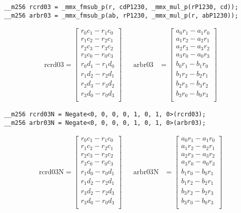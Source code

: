 \begin{verbatim}
__m256 rcrd03 = _mmx_fmsub_p(r, cdP1230, _mmx_mul_p(rP1230, cd));
__m256 arbr03 = _mmx_fmsub_p(ab, rP1230, _mmx_mul_p(r, abP1230));
\end{verbatim} 

\begin{align*}
\mathrm{rcrd03} 
=
\begin{bmatrix}
r_0c_1 - r_1c_0\\
r_1c_2 - r_2c_1\\
r_2c_3 - r_3c_2\\
r_3c_0 - r_0c_3\\
r_0d_1 - r_1d_0\\
r_1d_2 - r_2d_1\\
r_2d_3 - r_3d_2\\
r_3d_0 - r_0d_3\\
\end{bmatrix}
&&
\mathrm{arbr03} 
&=
\begin{bmatrix}
a_0r_1 - a_1r_0\\
a_1r_2 - a_2r_1\\
a_2r_3 - a_3r_2\\
a_3r_0 - a_0r_3\\
b_0r_1 - b_1r_0\\
b_1r_2 - b_2r_1\\
b_2r_3 - b_3r_2\\
b_3r_0 - b_0r_3\\
\end{bmatrix}
\end{align*}

\begin{verbatim}
__m256 rcrd03N = Negate<0, 0, 0, 0, 1, 0, 1, 0>(rcrd03);
__m256 arbr03N = Negate<0, 0, 0, 0, 1, 0, 1, 0>(arbr03);
\end{verbatim} 

\begin{align*}
\mathrm{rcrd03N} 
=
\begin{bmatrix}
r_0c_1 - r_1c_0\\
r_1c_2 - r_2c_1\\
r_2c_3 - r_3c_2\\
r_3c_0 - r_0c_3\\
r_1d_0 - r_0d_1\\
r_1d_2 - r_2d_1\\
r_3d_2 - r_2d_3\\
r_3d_0 - r_0d_3\\
\end{bmatrix}
&&
\mathrm{arbr03N} 
&=
\begin{bmatrix}
a_0r_1 - a_1r_0\\
a_1r_2 - a_2r_1\\
a_2r_3 - a_3r_2\\
a_3r_0 - a_0r_3\\
b_1r_0 - b_0r_1\\
b_1r_2 - b_2r_1\\
b_3r_2 - b_2r_3\\
b_3r_0 - b_0r_3\\
\end{bmatrix}
\end{align*}

